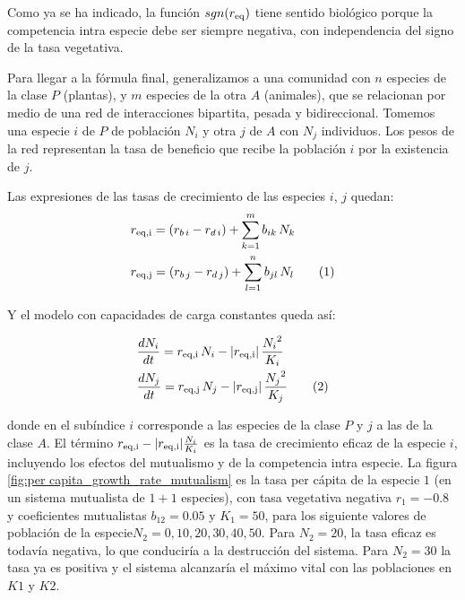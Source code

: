 Como ya se ha indicado, la función $sgn(r_{\rm{eq}})$ tiene sentido biológico porque la competencia intra especie debe ser siempre negativa, con independencia del signo de la tasa vegetativa.

Para llegar a la fórmula final, generalizamos a una comunidad con $n$ especies de la clase $P$ (plantas), y $m$ especies de la otra $A$ (animales), que se relacionan por medio de una red de interacciones bipartita, pesada y bidireccional. Tomemos una especie $i$ de $P$ de población $N_i$ y otra $j$ de $A$ con $N_j$ individuos. Los pesos de la red representan la tasa de beneficio que recibe la población $i$ por la existencia de $j$. 

Las expresiones de las tasas de crecimiento de las especies $i$, $j$ quedan:
\begin{align*}
\displaystyle & r_{\rm{eq},i}  = \left( r_{b\, i} - r_{d\, i} \right) + \sum\limits_{k=1}^{m} b_{ik}\, N_k  \\
\displaystyle & r_{\rm{eq},j}  = \left( r_{b\, j} - r_{d\, j} \right) + \sum\limits_{l=1}^{n} b_{jl}\, N_l
\stepcounter{equation}\tag{\theequation}\label{modelors}
\end{align*}

Y el modelo con capacidades de carga constantes queda así:

\begin{theo}
\begin{align*}
\displaystyle
&\frac{dN_i}{dt}=r_{\rm{eq},i}\, N_i - |r_{\rm{eq},i}| \, \frac{{N_i}^2}{K_i}  \\
\displaystyle
&\frac{dN_j}{dt}=r_{\rm{eq},j} \, N_j - |r_{\rm{eq},j}| \, \frac{{N_j}^2}{K_j}
\stepcounter{equation}\tag{\theequation}\label{eq:modelo_optionI}
\end{align*}
\end{theo}

\noindent donde en el subíndice $i$ corresponde a las especies de la clase $P$ y $j$ a las de la clase $A$. El término $r_{\rm{eq},i} - |r_{\rm{eq},i}| \frac{N_i}{K_i}$ es la tasa de crecimiento eficaz de la especie $i$, incluyendo los efectos del mutualismo y de la competencia intra especie. La figura \ref{fig:per capita_growth_rate_mutualism} es la tasa per cápita de la especie $1$ (en un sistema mutualista de $1+1$ especies),
con tasa vegetativa negativa $r_1=-0.8$ y coeficientes mutualistas $b_{12}=0.05$ y $K_1=50$, para los siguiente valores de población de la especie$N_2=0,10,20,30,40,50$. Para $N_2=20$, la tasa eficaz es todavía negativa, lo que conduciría a la destrucción del sistema. Para
$N_2=30$ la tasa ya es positiva y el sistema alcanzaría el máximo vital con las poblaciones en $K1$ y $K2$.

